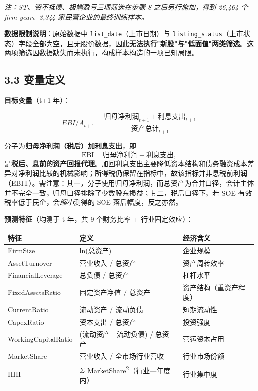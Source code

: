 \documentclass[11pt,a4paper]{ctexart}
\begin{document}
\emph{注：ST、资不抵债、极端盈亏三项筛选在步骤 8 之后另行施加，得到 26,464 个 firm-year、3,344 家民营企业的最终训练样本。}

\textbf{数据限制说明}：原始数据中 \texttt{list\_date}（上市日期）与 \texttt{listing\_status}（上市状态）字段全部为空，且无股价数据，因此\textbf{无法执行"新股"与"低面值"两类筛选}。这两项筛选因数据缺失而未执行，构成样本构造的一项已知局限。

\subsection{3.3 变量定义}

\textbf{目标变量}（t+1 年）：

\[EBI/A_{t+1} = \frac{\text{归母净利润}_{t+1} + \text{利息支出}_{t+1}}{\text{资产总计}_{t+1}}\]

分子为\textbf{归母净利润（税后）加利息支出}，即
\[
\text{EBI} = \text{归母净利润} + \text{利息支出},
\]
是\textbf{税后、息前的资产回报代理}。加回利息支出主要降低资本结构和债务融资成本差异对净利润比较的机械影响；所得税仍保留在指标中，故该指标并非息税前利润（EBIT）。需注意：其一，分子使用归母净利润，而总资产为合并口径，会计主体并不完全一致，归母口径排除了少数股东损益；其二，税后口径下，若 SOE 有效税率低于民企，会\emph{缩小}测得的 SOE 落后幅度，反之亦然。

\textbf{预测特征}（均测于 t 年，共 9 个财务比率 + 行业固定效应）：

\begin{center}
\centering
\small
\begin{tabular}{lll}
\toprule
特征 & 定义 & 经济含义 \\
\midrule
FirmSize & ln(总资产) & 企业规模 \\
AssetTurnover & 营业收入 / 总资产 & 资产周转效率 \\
FinancialLeverage & 总负债 / 总资产 & 杠杆水平 \\
FixedAssetsRatio & 固定资产净值 / 总资产 & 资产结构（重资产程度） \\
CurrentRatio & 流动资产 / 流动负债 & 短期流动性 \\
CapexRatio & 资本支出 / 总资产 & 投资强度 \\
WorkingCapitalRatio & (流动资产 - 流动负债) / 总资产 & 营运资本占用 \\
MarketShare & 营业收入 / 全市场行业营收 & 行业市场份额 \\
HHI & $\Sigma$ MarketShare\textsuperscript{2}（行业---年度内） & 行业集中度 \\
\bottomrule
\end{tabular}
\end{center}
\end{document}

